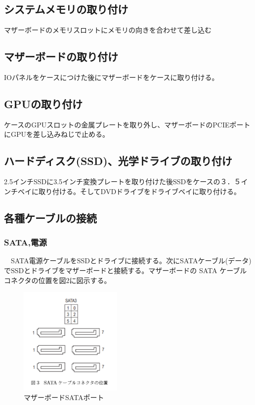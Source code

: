 \documentclass[10pt]{article}
\begin{document}
\subsection{システムメモリの取り付け}
\hspace{1cm}マザーボードのメモリスロットにメモリの向きを合わせて差し込む
	

\subsection{マザーボードの取り付け}
\hspace{1cm}IOパネルをケースにつけた後にマザーボードをケースに取り付ける。


\subsection{GPUの取り付け}
\hspace{1cm}ケースのGPUスロットの金属プレートを取り外し、マザーボードのPCIEポートにGPUを差し込みねじで止める。


\subsection{ハードディスク(SSD)、光学ドライブの取り付け}
\hspace{1cm}2.5インチSSDに3.5インチ変換プレートを取り付けた後SSDをケースの３．５インチベイに取り付ける。そしてDVDドライブをドライブベイに取り付ける。

\subsection{各種ケーブルの接続}
\subsubsection{SATA,電源}\hspace{1cm}　SATA電源ケーブルをSSDとドライブに接続する。次にSATAケーブル(データ)でSSDとドライブをマザーボードと接続する。マザーボードの SATA ケーブルコネクタの位置を図2に図示する。

\begin{figure}[H]
	\centering
	\includegraphics[width=5cm]{SATA.png}
	\caption{マザーボードSATAポート}
\end{figure}
\end{document}
